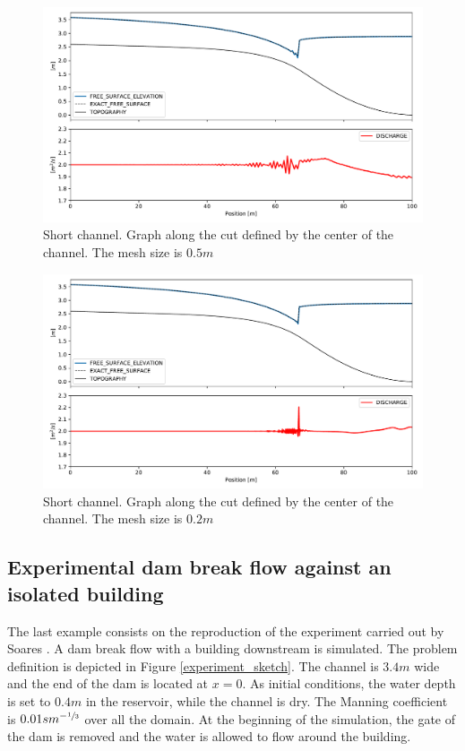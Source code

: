 \documentclass[a4paper,12pt]{elsarticle}
\begin{document}
\begin{figure}
    \centering
    \includegraphics[width=\textwidth]{img/jump/mesh_0.5.pdf}
    \caption{Short channel. Graph along the cut defined by the center of the channel. The mesh size is $0.5m$}
    \label{mac_donald_shock_graph_5}
\end{figure}

\begin{figure}
    \centering
    \includegraphics[width=\textwidth]{img/jump/mesh_0.2.pdf}
    \caption{Short channel. Graph along the cut defined by the center of the channel. The mesh size is $0.2m$}
    \label{mac_donald_shock_graph_2}
\end{figure}


\subsection{Experimental dam break flow against an isolated building}

The last example consists on the reproduction of the experiment carried out by Soares \cite{soares2007}.
A dam break flow with a building downstream is simulated. The problem definition is depicted in Figure \ref{experiment_sketch}. The channel is $3.4m$ wide and the end of the dam is located at $x=0$.
As initial conditions, the water depth is set to $0.4m$ in the reservoir, while the channel is dry. The Manning coefficient is $0.01sm^{-\sfrac{1}{3}}$ over all the domain.
At the beginning of the simulation, the gate of the dam is removed and the water is allowed to flow around the building.
\end{document}
